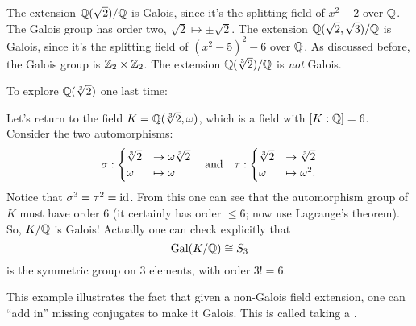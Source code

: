 \begin{example}
	\listhack
	\begin{enumerate}[(a)]
		\ii The extension $\mathbb Q(\sqrt2) / \mathbb Q$ is Galois,
		since it's the splitting field of $x^2-2$ over $\mathbb Q$.
		The Galois group has order two, $\sqrt 2 \mapsto \pm \sqrt 2$.
		\ii The extension $\mathbb Q(\sqrt2, \sqrt 3) / \mathbb Q$ is Galois,
		since it's the splitting field of $(x^2-5)^2-6$ over $\mathbb Q$.
		As discussed before, the Galois group is $\mathbb Z_{2} \times \mathbb Z_{2}$.
		\ii The extension $\mathbb Q(\sqrt[3]{2}) / \mathbb Q$ is \emph{not} Galois.
	\end{enumerate}
\end{example}


To explore $\mathbb Q(\sqrt[3]{2})$ one last time:
\begin{example}
	Let's return to the field $K = \mathbb Q(\sqrt[3]{2}, \omega)$,
	which is a field with $[K:\mathbb Q] = 6$.
	Consider the two automorphisms:
	\[
		\sigma:
		\begin{cases}
			\sqrt[3]{2} &\to \omega \sqrt[3]{2} \\
			\omega &\mapsto \omega
		\end{cases}
		\quad\text{and}\quad
		\tau:
		\begin{cases}
			\sqrt[3]{2} &\to \sqrt[3]{2} \\
			\omega &\mapsto \omega^2.
		\end{cases}
	\]
	Notice that $\sigma^3 = \tau^2 = \mathrm{id}$.
	From this one can see that the automorphism group of $K$ must have order $6$
	(it certainly has order $\le 6$; now use Lagrange's theorem).
	So, $K/\mathbb Q$ is Galois! Actually one can check explicitly that
	\[ \operatorname{Gal}(K/\mathbb Q) \cong S_3 \]
	is the symmetric group on $3$ elements, with order $3! = 6$.
\end{example}
This example illustrates the fact that
given a non-Galois field extension, 
one can ``add in'' missing conjugates to make it Galois.
This is called taking a .


